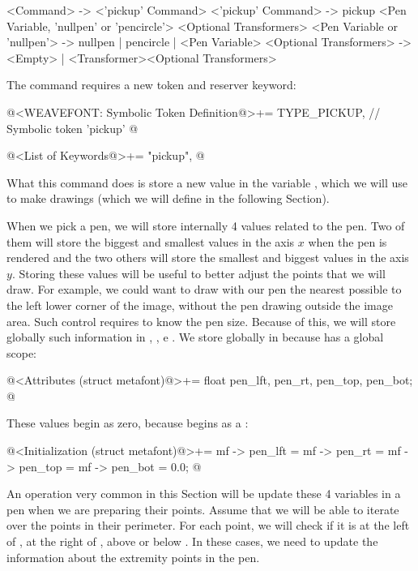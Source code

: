 {{{{{\alinhaverbatim
<Command> -> <'pickup' Command>
<'pickup' Command> -> pickup <Pen Variable, 'nullpen' or 'pencircle'>
                             <Optional Transformers>
<Pen Variable or 'nullpen'> -> nullpen | pencircle | <Pen Variable>
<Optional Transformers> -> <Empty> |
                           <Transformer><Optional Transformers>
\alinhanormal

The command requires a new token and reserver keyword:

\iniciocodigo
@<WEAVEFONT: Symbolic Token Definition@>+=
TYPE_PICKUP,  // Symbolic token 'pickup'
@
\fimcodigo

\iniciocodigo
@<List of Keywords@>+=
"pickup",
@
\fimcodigo

What this command does is store a new value in the
variable , which we will use to make drawings
(which we will define in the following Section).


When we pick a pen, we will store internally 4 values related to the
pen. Two of them will store the biggest and smallest values in the
axis $x$ when the pen is rendered and the two others will store the
smallest and biggest values in the axis $y$. Storing these values will
be useful to better adjust the points that we will draw. For example,
we could want to draw with our pen the nearest possible to the left
lower corner of the image, without the pen drawing outside the image
area. Such control requires to know the pen size. Because of this, we
will store globally such information
in , , 
e . We store globally in  because  has a global scope:

\iniciocodigo
@<Attributes (struct metafont)@>+=
float pen_lft, pen_rt, pen_top, pen_bot;
@
\fimcodigo

These values begin as zero, because  begins as
a :

\iniciocodigo
@<Initialization (struct metafont)@>+=
mf -> pen_lft = mf -> pen_rt = mf -> pen_top = mf -> pen_bot = 0.0;
@
\fimcodigo

An operation very common in this Section will be update these 4
variables in a pen when we are preparing their points. Assume that we
will be able to iterate over the points in their perimeter. For each
point, we will check if it is at the left of , at
the right of , above  or
below . In these cases, we need to update the
information about the extremity points in the pen.

}}}}}
